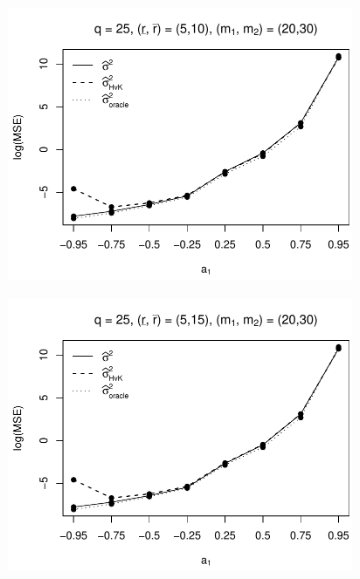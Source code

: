 \begin{figure}[p]
\begin{subfigure}[b]{0.45\textwidth}
\includegraphics[width=\textwidth]{Plots/Plots_Supplement/MSE_lrv_T=500_slope=1_(L1,L2,K1,K2,M1,M2)=(25,25,5,10,20,30).pdf}
\end{subfigure}
\hspace{0.25cm}
\begin{subfigure}[b]{0.45\textwidth}
\includegraphics[width=\textwidth]{Plots/Plots_Supplement/MSE_lrv_T=500_slope=1_(L1,L2,K1,K2,M1,M2)=(25,25,5,15,20,30).pdf}
\end{subfigure}


\end{figure}

